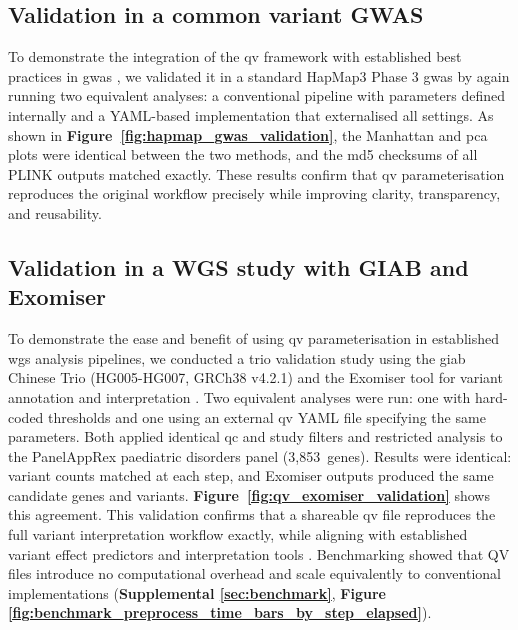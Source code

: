 \subsection{Validation in a common variant GWAS}
To demonstrate the integration of the \ac{qv} framework with established best practices in \ac{gwas} \cite{2021uffelmannGenomewideAssociationStudies}, we validated it in a standard HapMap3 Phase 3 \ac{gwas} by again running two equivalent analyses: a conventional pipeline with parameters defined internally and a YAML-based implementation that externalised all settings.
As shown in \textbf{Figure~\ref{fig:hapmap_gwas_validation}}, the Manhattan and \ac{pca} plots were identical between the two methods, and the \ac{md5} checksums of all PLINK outputs matched exactly. These results confirm that \ac{qv} parameterisation reproduces the original workflow precisely while improving clarity, transparency, and reusability.

\subsection{Validation in a WGS study with GIAB and Exomiser}
To demonstrate the ease and benefit of using \ac{qv} parameterisation in established \ac{wgs} analysis pipelines, we conducted a trio validation study using the \ac{giab} Chinese Trio (HG005-HG007, GRCh38 v4.2.1) and the Exomiser tool for variant annotation and interpretation \cite{2020ciprianiImprovedPhenotypeDrivenTool}. 
Two equivalent analyses were run: one with hard-coded thresholds and one using an external \ac{qv} YAML file specifying the same parameters. Both applied identical \ac{qc} and study filters and restricted analysis to the PanelAppRex paediatric disorders panel (3{,}853~genes). Results were identical: variant counts matched at each step, and Exomiser outputs produced the same candidate genes and variants. \textbf{Figure~\ref{fig:qv_exomiser_validation}} shows this agreement.
This validation confirms that a shareable \ac{qv} file reproduces the full variant interpretation workflow exactly, while aligning with established variant effect predictors and interpretation tools \cite{2024riccioVariantEffectPredictors, 2020ciprianiImprovedPhenotypeDrivenTool, 2020holtgreweVarFishComprehensiveDNA}.
Benchmarking showed that QV files introduce no computational overhead and scale equivalently to conventional implementations 
(\textbf{Supplemental \ref{sec:benchmark}}, 
\textbf{Figure \ref{fig:benchmark_preprocess_time_bars_by_step_elapsed}}).

